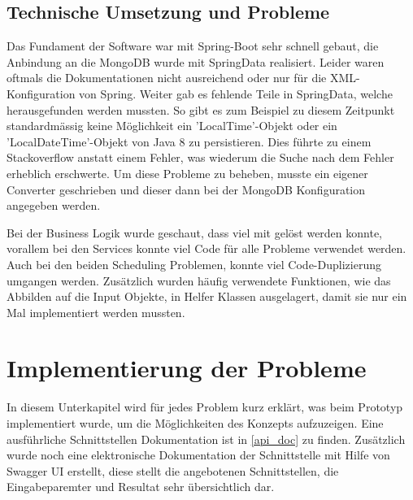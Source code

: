 \subsection{Technische Umsetzung und Probleme}
Das Fundament der Software war mit Spring-Boot \cite{spring_boot} sehr schnell gebaut, die Anbindung an die MongoDB wurde mit SpringData \cite{spring_data} realisiert. Leider waren 
oftmals die Dokumentationen nicht ausreichend oder nur für die XML-Konfiguration von Spring. Weiter gab es fehlende Teile in SpringData, welche herausgefunden werden mussten. 
So gibt es zum Beispiel zu diesem Zeitpunkt standardmässig keine Möglichkeit ein 'LocalTime'-Objekt oder ein 'LocalDateTime'-Objekt von Java 8 zu persistieren. Dies führte zu einem 
Stackoverflow anstatt einem Fehler, was wiederum die Suche nach dem Fehler erheblich erschwerte. Um diese Probleme zu beheben, musste ein eigener Converter geschrieben und dieser 
dann bei der MongoDB Konfiguration angegeben werden.

Bei der Business Logik wurde geschaut, dass viel mit  gelöst werden konnte, vorallem bei den Services konnte viel Code für alle Probleme verwendet werden. Auch 
bei den beiden Scheduling Problemen, konnte viel Code-Duplizierung umgangen werden. Zusätzlich wurden häufig verwendete Funktionen, wie das Abbilden auf die Input Objekte, in Helfer 
Klassen ausgelagert, damit sie nur ein Mal implementiert werden mussten.

\section{Implementierung der Probleme}\label{impl_problems}
In diesem Unterkapitel wird für jedes Problem kurz erklärt, was beim Prototyp implementiert wurde, um die Möglichkeiten des Konzepts aufzuzeigen. Eine ausführliche Schnittstellen 
Dokumentation ist in \autoref{api_doc} zu finden. Zusätzlich wurde noch eine elektronische Dokumentation der Schnittstelle mit Hilfe von Swagger UI erstellt, diese stellt die angebotenen 
Schnittstellen, die Eingabeparemter und Resultat sehr übersichtlich dar.

